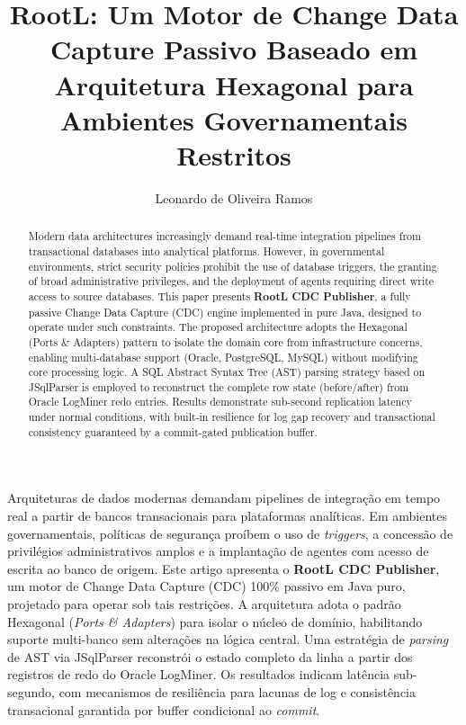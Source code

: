 \documentclass[12pt]{article}
\title{RootL: Um Motor de Change Data Capture Passivo Baseado em\\
  Arquitetura Hexagonal para Ambientes Governamentais Restritos}
\author{Leonardo de Oliveira Ramos\inst{1,2}}
\begin{document}
\maketitle

\begin{abstract}
  Modern data architectures increasingly demand real-time integration
  pipelines from transactional databases into analytical platforms.
  However, in governmental environments, strict security policies prohibit
  the use of database triggers, the granting of broad administrative
  privileges, and the deployment of agents requiring direct write access
  to source databases. This paper presents \textbf{RootL CDC Publisher},
  a fully passive Change Data Capture (CDC) engine implemented in pure Java,
  designed to operate under such constraints. The proposed architecture
  adopts the Hexagonal (Ports \& Adapters) pattern to isolate the domain
  core from infrastructure concerns, enabling multi-database support
  (Oracle, PostgreSQL, MySQL) without modifying core processing logic.
  A SQL Abstract Syntax Tree (AST) parsing strategy based on JSqlParser
  is employed to reconstruct the complete row state (before/after) from
  Oracle LogMiner redo entries. Results demonstrate sub-second replication
  latency under normal conditions, with built-in resilience for log gap
  recovery and transactional consistency guaranteed by a commit-gated
  publication buffer.
\end{abstract}

\begin{resumo}
  Arquiteturas de dados modernas demandam pipelines de integração em tempo
  real a partir de bancos transacionais para plataformas analíticas. Em
  ambientes governamentais, políticas de segurança proíbem o uso de
  \textit{triggers}, a concessão de privilégios administrativos amplos e
  a implantação de agentes com acesso de escrita ao banco de origem. Este
  artigo apresenta o \textbf{RootL CDC Publisher}, um motor de Change Data
  Capture (CDC) 100\% passivo em Java puro, projetado para operar sob tais
  restrições. A arquitetura adota o padrão Hexagonal (\textit{Ports \&
  Adapters}) para isolar o núcleo de domínio, habilitando suporte multi-banco
  sem alterações na lógica central. Uma estratégia de \textit{parsing} de
  AST via JSqlParser reconstrói o estado completo da linha a partir dos
  registros de redo do Oracle LogMiner. Os resultados indicam latência
  sub-segundo, com mecanismos de resiliência para lacunas de log e
  consistência transacional garantida por buffer condicional ao
  \textit{commit}.
\end{resumo}
\end{document}
